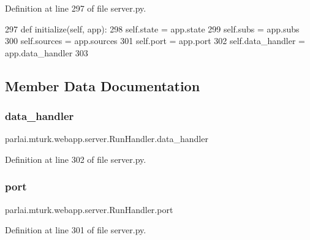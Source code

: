 Definition at line 297 of file server.\+py.


\begin{DoxyCode}
297     \textcolor{keyword}{def }initialize(self, app):
298         self.state = app.state
299         self.subs = app.subs
300         self.sources = app.sources
301         self.port = app.port
302         self.data\_handler = app.data\_handler
303 
\end{DoxyCode}


\subsection{Member Data Documentation}
\mbox{\label{classparlai_1_1mturk_1_1webapp_1_1server_1_1RunHandler_a55ebe293c2c36001b28f879a256fb03d}} 
\subsubsection{\texorpdfstring{data\+\_\+handler}{data\_handler}}
{\footnotesize\ttfamily parlai.\+mturk.\+webapp.\+server.\+Run\+Handler.\+data\+\_\+handler}



Definition at line 302 of file server.\+py.

\mbox{\label{classparlai_1_1mturk_1_1webapp_1_1server_1_1RunHandler_a18313aaf7e807891e1d21b0930639ca9}} 
\subsubsection{\texorpdfstring{port}{port}}
{\footnotesize\ttfamily parlai.\+mturk.\+webapp.\+server.\+Run\+Handler.\+port}



Definition at line 301 of file server.\+py.

